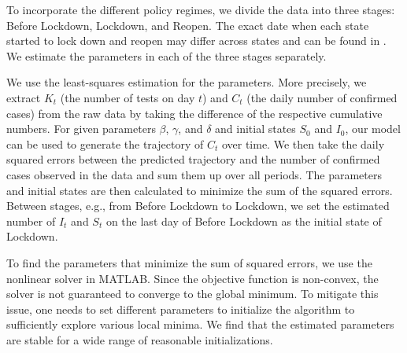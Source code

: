 \documentclass[nonblindrev, copyedit]{informs3a}
\newcommand\nc[1]{\textcolor{red}{NC: #1}}
\begin{document}
To incorporate the different policy regimes, we divide the data into three stages: Before Lockdown, Lockdown,  and Reopen. The exact date when each state started to lock down and reopen may differ across states and can be found in \citet{Elassar2020This}.
We estimate the parameters in each of the three stages separately.

We use the least-squares estimation for the parameters.
More precisely, we extract $K_t$ (the number of tests on day $t$) and $C_t$ (the daily number of confirmed cases) from the raw data by taking the difference of the respective cumulative numbers.
For given parameters $\beta$, $\gamma$, and $\delta$ and initial states $S_0$ and $I_0$, our model can be used to generate the trajectory of $C_t$ over time.
We then take the daily squared errors between the predicted trajectory and the number of confirmed cases observed in the data and sum them up over all periods.
The parameters and initial states are then calculated to minimize the sum of the squared errors.
Between stages, e.g., from Before Lockdown to Lockdown, we set the estimated number of $I_t$ and $S_t$ on the last day of Before Lockdown as the initial state of Lockdown.

To find the parameters that minimize the sum of squared errors, we use the nonlinear solver in MATLAB.
Since the objective function is non-convex, the solver is not guaranteed to converge to the global minimum.
To mitigate this issue, one needs to set different parameters to initialize the algorithm to sufficiently explore various local minima. We find that the estimated parameters are stable for a wide range of reasonable initializations.



\end{document}
